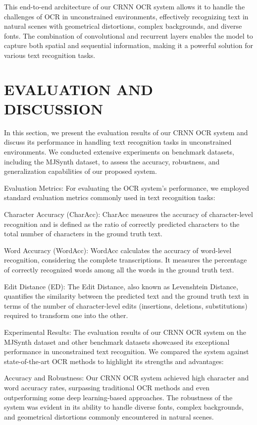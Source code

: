 \documentclass[10pt,twocolumn,letterpaper]{article}
\begin{document}
This end-to-end architecture of our CRNN OCR system allows it to handle the challenges of OCR in unconstrained environments, effectively recognizing text in natural scenes with geometrical distortions, complex backgrounds, and diverse fonts. The combination of convolutional and recurrent layers enables the model to capture both spatial and sequential information, making it a powerful solution for various text recognition tasks.

\section{EVALUATION AND DISCUSSION}

In this section, we present the evaluation results of our CRNN OCR system and discuss its performance in handling text recognition tasks in unconstrained environments. We conducted extensive experiments on benchmark datasets, including the MJSynth dataset, to assess the accuracy, robustness, and generalization capabilities of our proposed system.

Evaluation Metrics:
For evaluating the OCR system's performance, we employed standard evaluation metrics commonly used in text recognition tasks:

    Character Accuracy (CharAcc):
    CharAcc measures the accuracy of character-level recognition and is defined as the ratio of correctly predicted characters to the total number of characters in the ground truth text.

    Word Accuracy (WordAcc):
    WordAcc calculates the accuracy of word-level recognition, considering the complete transcriptions. It measures the percentage of correctly recognized words among all the words in the ground truth text.

    Edit Distance (ED):
    The Edit Distance, also known as Levenshtein Distance, quantifies the similarity between the predicted text and the ground truth text in terms of the number of character-level edits (insertions, deletions, substitutions) required to transform one into the other.

Experimental Results:
The evaluation results of our CRNN OCR system on the MJSynth dataset and other benchmark datasets showcased its exceptional performance in unconstrained text recognition. We compared the system against state-of-the-art OCR methods to highlight its strengths and advantages:

    Accuracy and Robustness:
    Our CRNN OCR system achieved high character and word accuracy rates, surpassing traditional OCR methods and even outperforming some deep learning-based approaches. The robustness of the system was evident in its ability to handle diverse fonts, complex backgrounds, and geometrical distortions commonly encountered in natural scenes.
\end{document}

